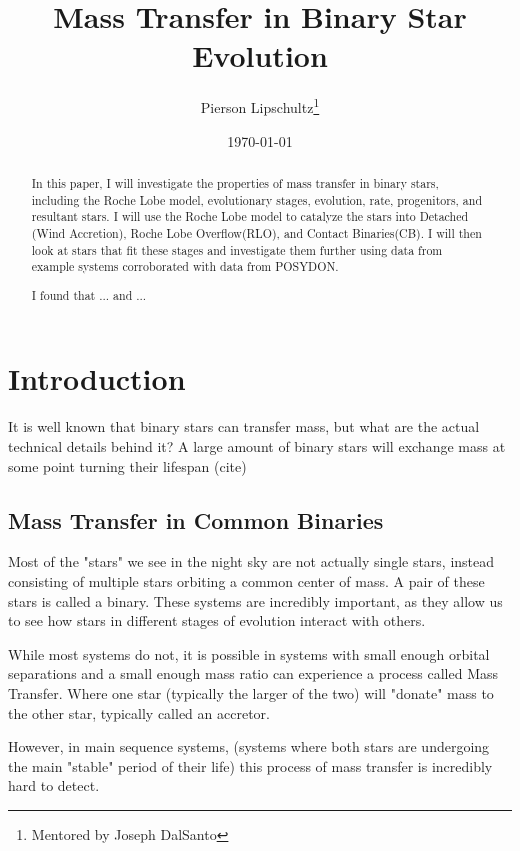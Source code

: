 \documentclass[12pt, letterpaper]{article}
\title{Mass Transfer in Binary Star Evolution}
\author{Pierson Lipschultz\thanks{Mentored by Joseph DalSanto}}
\date{\today}
\begin{document}
\maketitle
\begin{abstract}
    \normalsize
    In this paper, I will investigate the properties of mass transfer in binary stars, including the Roche Lobe model, evolutionary stages, evolution, rate, progenitors, and resultant stars. I will use the Roche Lobe model to catalyze the stars into Detached (Wind Accretion), Roche Lobe Overflow(RLO), and Contact Binaries(CB). I will then look at stars that fit these stages and investigate them further using data from example systems corroborated with data from POSYDON.

    I found that ... and ...
\end{abstract}

\pagebreak

\section{\centering Introduction} %
    It is well known that binary stars can transfer mass, but what are the actual technical details behind it? A large amount of binary stars will exchange mass at some point turning their lifespan (cite)

    \subsection{Mass Transfer in Common Binaries}
    
    
    Most of the "stars" we see in the night sky are not actually single stars, instead consisting of multiple stars orbiting a common center of mass. A pair of these stars is called a binary. These systems are incredibly important, as they allow us to see how stars in different stages of evolution interact with others. 

    While most systems do not, it is possible in systems with small enough orbital separations and a small enough mass ratio can experience a process called Mass Transfer. Where one star (typically the larger of the two) will "donate" mass to the other star, typically called an accretor. 

    However, in main sequence systems, (systems where both stars are undergoing the main "stable" period of their life) this process of mass transfer is incredibly hard to detect.
\end{document}
